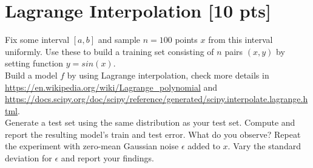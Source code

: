 \documentclass[a4paper]{article}
\theoremstyle{definition}
\begin{document}
\section{Lagrange Interpolation [10 pts]}
Fix some interval $[a, b]$ and sample $n = 100$ points $x$ from this interval uniformly. Use these to build a training set consisting of $n$ pairs $(x, y)$ by setting function $y = sin(x)$. \\

Build a model $f$ by using Lagrange interpolation, check more details in \url{https://en.wikipedia.org/wiki/Lagrange_polynomial} and \url{https://docs.scipy.org/doc/scipy/reference/generated/scipy.interpolate.lagrange.html}. \\

Generate a test set using the same distribution as your test set. Compute and report the resulting model’s train and test error. What do you observe?
Repeat the experiment with zero-mean Gaussian noise $\epsilon$ added to $x$. Vary the standard deviation for $\epsilon$ and report your findings.


\end{document}
